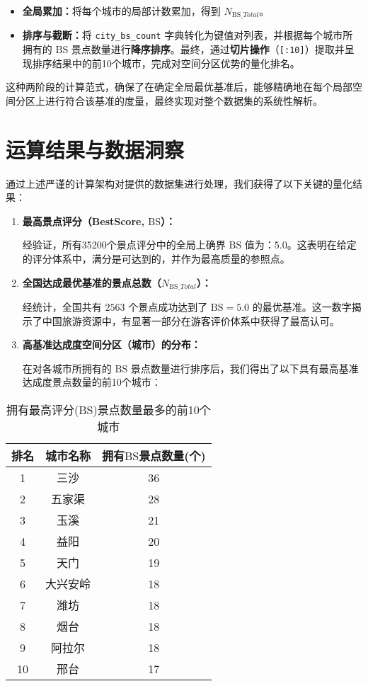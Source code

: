 \documentclass[12pt]{article}
\newcommand{\BS}{\text{BS}}
\newcommand{\NBS}{N_{\BS\_Total}}
\begin{document}
\begin{enumerate}[leftmargin=*]
\begin{itemize}[leftmargin=*]
        \item \textbf{全局累加：}将每个城市的局部计数累加，得到 $\NBS$。
        
        \item \textbf{排序与截断：}将 \texttt{city\_bs\_count} 字典转化为键值对列表，并根据每个城市所拥有的 $\BS$ 景点数量进行\textbf{降序排序}。最终，通过\textbf{切片操作}（\texttt{[:10]}）提取并呈现排序结果中的前10个城市，完成对空间分区优势的量化排名。
    \end{itemize}
\end{enumerate}

这种两阶段的计算范式，确保了在确定全局最优基准后，能够精确地在每个局部空间分区上进行符合该基准的度量，最终实现对整个数据集的系统性解析。

\section{运算结果与数据洞察}

通过上述严谨的计算架构对提供的数据集进行处理，我们获得了以下关键的量化结果：

\begin{enumerate}[leftmargin=*]
    \item \textbf{最高景点评分（BestScore, $\BS$）：}
    
    经验证，所有35200个景点评分中的全局上确界 $\BS$ 值为：$5.0$。这表明在给定的评分体系中，满分是可达到的，并作为最高质量的参照点。

    \item \textbf{全国达成最优基准的景点总数（$\NBS$）：}
    
    经统计，全国共有 $2563$ 个景点成功达到了 $\BS=5.0$ 的最优基准。这一数字揭示了中国旅游资源中，有显著一部分在游客评价体系中获得了最高认可。

    \item \textbf{高基准达成度空间分区（城市）的分布：}
    
    在对各城市所拥有的 $\BS$ 景点数量进行排序后，我们得出了以下具有最高基准达成度景点数量的前10个城市：
\end{enumerate}

\begin{table}[H]
\centering
\caption{拥有最高评分($\BS$)景点数量最多的前10个城市}
\label{tab:pro1_top10cities}
\begin{tabular}{ccc}
\toprule
\textbf{排名} & \textbf{城市名称} & \textbf{拥有$\BS$景点数量(个)} \\
\midrule
1    & 三沙     & 36 \\
2    & 五家渠   & 28 \\
3    & 玉溪     & 21 \\
4    & 益阳     & 20 \\
5    & 天门     & 19 \\
6    & 大兴安岭 & 18 \\
7    & 潍坊     & 18 \\
8    & 烟台     & 18 \\
9    & 阿拉尔   & 18 \\
10   & 邢台     & 17 \\
\bottomrule
\end{tabular}
\end{table}
\end{document}
